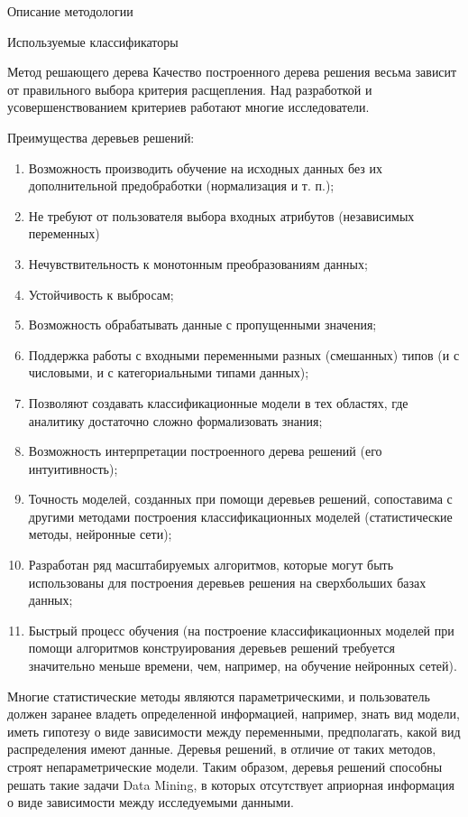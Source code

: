 \begin{section}{Описание методологии}
\begin{subsection}{Используемые классификаторы}
\begin{subsubsection}{Метод решающего дерева}
Качество построенного дерева решения весьма зависит от правильного выбора критерия расщепления. Над разработкой и усовершенствованием критериев работают многие исследователи.

Преимущества деревьев решений:
\begin{enumerate}
  \item Возможность производить обучение на исходных данных без их дополнительной предобработки (нормализация и т. п.);
  \item Не требуют от пользователя выбора входных атрибутов (независимых переменных)
  \item Нечувствительность к монотонным преобразованиям данных;
  \item Устойчивость к выбросам;
  \item Возможность обрабатывать данные с пропущенными значения;
  \item Поддержка работы с входными переменными разных (смешанных) типов (и с числовыми, и с категориальными типами данных);
  \item Позволяют создавать классификационные модели в тех областях, где аналитику достаточно сложно формализовать знания;
  \item Возможность интерпретации построенного дерева решений (его интуитивность);
  \item Точность моделей, созданных при помощи деревьев решений, сопоставима с другими методами построения классификационных моделей (статистические методы, нейронные сети);
  \item Разработан ряд масштабируемых алгоритмов, которые могут быть использованы для построения деревьев решения на сверхбольших базах данных;
  \item Быстрый процесс обучения (на построение классификационных моделей при помощи алгоритмов конструирования деревьев решений требуется значительно меньше времени, чем, например, на обучение нейронных сетей).
\end{enumerate}


Многие статистические методы являются параметрическими, и пользователь должен заранее владеть определенной информацией, например, знать вид модели, иметь гипотезу о виде зависимости между переменными, предполагать, какой вид распределения имеют данные. Деревья решений, в отличие от таких методов, строят непараметрические модели. Таким образом, деревья решений способны решать такие задачи Data Mining, в которых отсутствует априорная информация о виде зависимости между исследуемыми данными.


\end{subsubsection}
\end{subsection}
\end{section}
